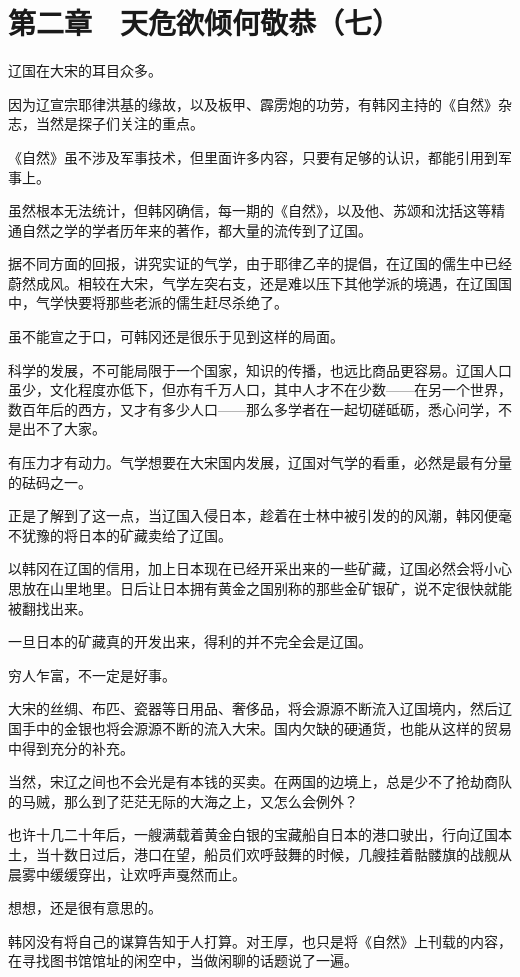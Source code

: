 \section{第二章　天危欲倾何敬恭（七）}

辽国在大宋的耳目众多。

因为辽宣宗耶律洪基的缘故，以及板甲、霹雳炮的功劳，有韩冈主持的《自然》杂志，当然是探子们关注的重点。

《自然》虽不涉及军事技术，但里面许多内容，只要有足够的认识，都能引用到军事上。

虽然根本无法统计，但韩冈确信，每一期的《自然》，以及他、苏颂和沈括这等精通自然之学的学者历年来的著作，都大量的流传到了辽国。

据不同方面的回报，讲究实证的气学，由于耶律乙辛的提倡，在辽国的儒生中已经蔚然成风。相较在大宋，气学左突右支，还是难以压下其他学派的境遇，在辽国国中，气学快要将那些老派的儒生赶尽杀绝了。

虽不能宣之于口，可韩冈还是很乐于见到这样的局面。

科学的发展，不可能局限于一个国家，知识的传播，也远比商品更容易。辽国人口虽少，文化程度亦低下，但亦有千万人口，其中人才不在少数——在另一个世界，数百年后的西方，又才有多少人口——那么多学者在一起切磋砥砺，悉心问学，不是出不了大家。

有压力才有动力。气学想要在大宋国内发展，辽国对气学的看重，必然是最有分量的砝码之一。

正是了解到了这一点，当辽国入侵日本，趁着在士林中被引发的的风潮，韩冈便毫不犹豫的将日本的矿藏卖给了辽国。

以韩冈在辽国的信用，加上日本现在已经开采出来的一些矿藏，辽国必然会将小心思放在山里地里。日后让日本拥有黄金之国别称的那些金矿银矿，说不定很快就能被翻找出来。

一旦日本的矿藏真的开发出来，得利的并不完全会是辽国。

穷人乍富，不一定是好事。

大宋的丝绸、布匹、瓷器等日用品、奢侈品，将会源源不断流入辽国境内，然后辽国手中的金银也将会源源不断的流入大宋。国内欠缺的硬通货，也能从这样的贸易中得到充分的补充。

当然，宋辽之间也不会光是有本钱的买卖。在两国的边境上，总是少不了抢劫商队的马贼，那么到了茫茫无际的大海之上，又怎么会例外？

也许十几二十年后，一艘满载着黄金白银的宝藏船自日本的港口驶出，行向辽国本土，当十数日过后，港口在望，船员们欢呼鼓舞的时候，几艘挂着骷髅旗的战舰从晨雾中缓缓穿出，让欢呼声戛然而止。

想想，还是很有意思的。

韩冈没有将自己的谋算告知于人打算。对王厚，也只是将《自然》上刊载的内容，在寻找图书馆馆址的闲空中，当做闲聊的话题说了一遍。

